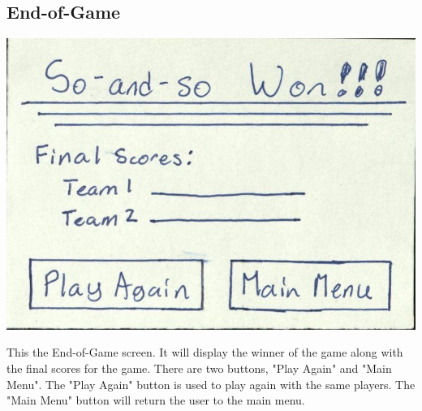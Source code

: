 \documentclass[]{scrartcl}
\begin{document}
\subsection{End-of-Game}
\centerline{\includegraphics{10.jpg}}
This the End-of-Game screen. It will display the winner of the game along with the final scores for the game. There are two buttons, "Play Again" and "Main Menu". The "Play Again" button is used to play again with the same players. The "Main Menu" button will return the user to the main menu.
\end{document}
